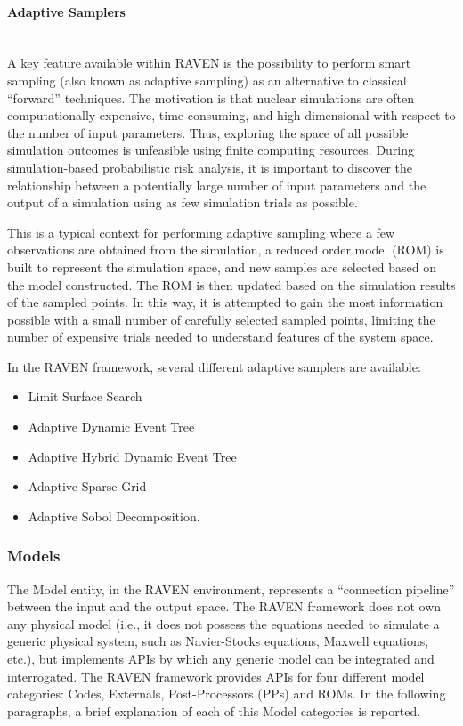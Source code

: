 \paragraph{Adaptive Samplers}~\\
A key feature available within RAVEN is the possibility to perform smart sampling (also known as adaptive sampling) as an alternative to classical ``forward'' techniques. The motivation is that nuclear simulations are often computationally expensive, time-consuming, and high dimensional with respect to the number of input parameters. Thus, exploring the space of all possible simulation outcomes is unfeasible using finite computing resources. During simulation-based probabilistic risk analysis, it is important to discover the relationship between a potentially large number of input parameters and the output of a simulation using as few simulation trials as possible.

This is a typical context for performing adaptive sampling where a few observations are obtained from the simulation, a reduced order model (ROM) is built to represent the simulation space, and new samples are selected based on the model constructed. The ROM is then updated based on the simulation results of the sampled points. In this way, it is attempted to gain the most information possible with a small number of carefully selected sampled points, limiting the number of expensive trials needed to understand features of the system space.

In the RAVEN framework, several different adaptive samplers are available:
\begin{itemize}
\item Limit Surface Search
\item Adaptive Dynamic Event Tree
\item Adaptive Hybrid Dynamic Event Tree
\item Adaptive Sparse Grid
\item Adaptive Sobol Decomposition.
\end{itemize}

\subsubsection{Models}
The Model entity, in the RAVEN environment, represents a ``connection pipeline'' between the input and the output space. The RAVEN framework does not own any physical model (i.e., it does not possess the equations needed to simulate a generic physical system, such as Navier-Stocks equations, Maxwell equations, etc.), but implements APIs by which any generic model can be integrated and interrogated. The RAVEN framework provides APIs for four different model categories: Codes, Externals, Post-Processors (PPs) and ROMs. In the following paragraphs, a brief explanation of each of this Model categories is reported.
